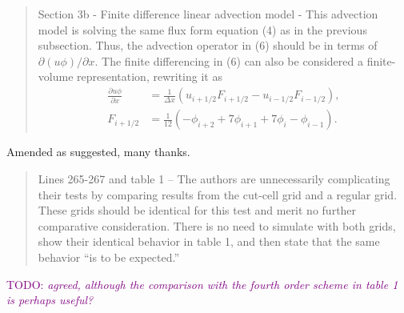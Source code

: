 \documentclass{article}
\newcommand{\TODO}[1]{\textcolor{purple}{TODO: \emph{#1}}}
\begin{document}
\begin{quotation}
	Section 3b - Finite difference linear advection model - This advection model is solving the same flux form equation (4) as in the previous subsection. Thus, the advection operator in (6) should be in terms of $\partial (u\phi)/\partial x$.  The finite differencing in (6) can also be considered a finite-volume representation, rewriting it as 
	\begin{align*}
		\frac{\partial u \phi}{\partial x} &= \frac{1}{\Delta x} \left( u_{i+1/2} F_{i+1/2} - u_{i - 1/2} F_{i - 1/2}\right), \\
		F_{i+1/2} &= \frac{1}{12} \left( - \phi_{i+2} + 7 \phi_{i+1} + 7 \phi_i - \phi_{i-1} \right).
	\end{align*}
\end{quotation}
Amended as suggested, many thanks.

\begin{quotation}
 Lines 265-267 and table 1 – The authors are unnecessarily complicating their tests  by comparing results from the cut-cell grid and a regular grid. These grids should be identical for this test and merit no further comparative consideration. There is no need to simulate with both grids, show their identical behavior in table 1, and then  state that the same behavior ``is to be expected.''
\end{quotation}
\TODO{agreed, although the comparison with the fourth order scheme in table 1 is perhaps useful?}
\end{document}
